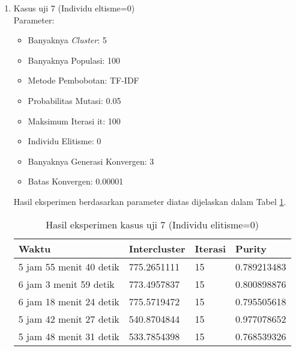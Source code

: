 \begin{enumerate}
	\item Kasus uji 7 (Individu eltisme=0)\\
	Parameter:
	\begin{itemize}
		\item Banyaknya \textit{Cluster}: 5
		\item Banyaknya Populasi: 100
		\item Metode Pembobotan: TF-IDF
		\item Probabilitas Mutasi: 0.05
		\item Maksimum Iterasi it: 100
		\item Individu Elitisme: 0
		\item Banyaknya Generasi Konvergen: 3
		\item Batas Konvergen: 0.00001
	\end{itemize}
	Hasil eksperimen berdasarkan parameter diatas dijelaskan dalam Tabel \ref{tbl:res7}.
	\begin{table}[H]
		\centering
		\caption{Hasil eksperimen kasus uji 7 (Individu elitisme=0)}
		\begin{tabular}{|l|l|l|l|} \hline
			Waktu & Intercluster & Iterasi & Purity \\ \hline
			5 jam 55 menit 40 detik & 775.2651111 & 15 & 0.789213483 \\ \hline
			6 jam 3 menit 59 detik  & 773.4957837 & 15 & 0.800898876 \\ \hline
			6 jam 18 menit 24 detik & 775.5719472 & 15 & 0.795505618 \\ \hline
			5 jam 42 menit 27 detik & 540.8704844 & 15 & 0.977078652 \\ \hline
			5 jam 48 menit 31 detik & 533.7854398 & 15 & 0.768539326 \\ \hline
		\end{tabular}
		\label{tbl:res7}
	\end{table}


\end{enumerate}
